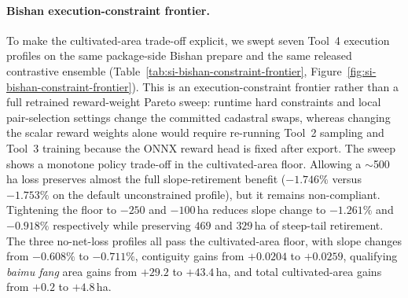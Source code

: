 \documentclass[11pt]{article}
\begin{document}
\begin{table}[htbp]
\centering
\small
\caption{Unconstrained versus hard cultivated-area no-net-loss planning on the two real counties. Slope, contiguity, \textit{baimu fang}, and cultivated-area deltas are recomputed from the optimised shapefile by GIS-only scripts. Steep-tail delta is the total farmland-area change in the $15$--$25^{\circ}$ and $>25^{\circ}$ slope bands. Source files: \texttt{policy\_translation\_bishan.json}, \texttt{policy\_translation\_bishan\_constrained.json}, \texttt{policy\_translation\_neijiang.json}, and \texttt{policy\_translation\_neijiang\_constrained.json}.}
\label{tab:si-constrained-policy}
\end{table}

\paragraph{Bishan execution-constraint frontier.} To make the cultivated-area trade-off explicit, we swept seven Tool~4 execution profiles on the same package-side Bishan prepare and the same released contrastive ensemble (Table~\ref{tab:si-bishan-constraint-frontier}, Figure~\ref{fig:si-bishan-constraint-frontier}). This is an execution-constraint frontier rather than a full retrained reward-weight Pareto sweep: runtime hard constraints and local pair-selection settings change the committed cadastral swaps, whereas changing the scalar reward weights alone would require re-running Tool~2 sampling and Tool~3 training because the ONNX reward head is fixed after export. The sweep shows a monotone policy trade-off in the cultivated-area floor. Allowing a $\sim$500\,ha loss preserves almost the full slope-retirement benefit ($-1.746\%$ versus $-1.753\%$ on the default unconstrained profile), but it remains non-compliant. Tightening the floor to $-250$ and $-100$\,ha reduces slope change to $-1.261\%$ and $-0.918\%$ respectively while preserving $469$ and $329$\,ha of steep-tail retirement. The three no-net-loss profiles all pass the cultivated-area floor, with slope changes from $-0.608\%$ to $-0.711\%$, contiguity gains from $+0.0204$ to $+0.0259$, qualifying \textit{baimu fang} area gains from $+29.2$ to $+43.4$\,ha, and total cultivated-area gains from $+0.2$ to $+4.8$\,ha.
\end{document}
